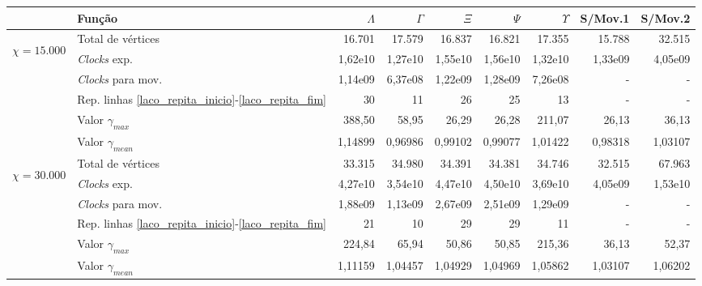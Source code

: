 \begin{table}
\begin{center}
\begin{tabular}{|c|l|r|r|r|r|r|r|r|} %
\hline
& Função & $\Lambda$ & $\Gamma$ & $\Xi$ & $\Psi$ & $\Upsilon$ & S/Mov.1 & S/Mov.2 \\
\hline %
\multirow{5}{*}{\begin{sideways}$\chi = 15.000$\end{sideways} } 
& Total de vértices                                                     & 16.701 & 17.579 & 16.837 & 16.821 & 17.355 & 15.788 & 32.515 \\
& {\it Clocks} exp.	                                             	& 1,62e10 & 1,27e10 & 1,55e10 & 1,56e10 & 1,32e10 & 1,33e09 & 4,05e09\\
& {\it Clocks} para mov.                                      		& 1,14e09 & 6,37e08 & 1,22e09 & 1,28e09 & 7,26e08 & - & - \\
& Rep. linhas \ref{laco_repita_inicio}-\ref{laco_repita_fim} 		& 30 & 11 & 26 & 25 & 13 & - & - \\
& Valor $\gamma_{max}$							& 388,50 & 58,95 & 26,29 & 26,28 & 211,07 & 26,13 & 36,13 \\
& Valor $\gamma_{mean}$							& 1,14899 & 0,96986 & 0,99102 & 0,99077 & 1,01422 & 0,98318 & 1,03107 \\
\hline %
\multirow{5}{*}{\begin{sideways}$\chi = 30.000$\end{sideways} } 
& Total de vértices                                                     & 33.315 & 34.980 &  34.391 & 34.381 & 34.746 & 32.515 & 67.963 \\
& {\it Clocks} exp.	                                             	& 4,27e10 & 3,54e10 & 4,47e10 & 4,50e10 & 3,69e10 & 4,05e09 & 1,53e10 \\
& {\it Clocks} para mov.                                      		& 1,88e09 & 1,13e09 & 2,67e09 & 2,51e09 & 1,29e09 & - & - \\
& Rep. linhas \ref{laco_repita_inicio}-\ref{laco_repita_fim} 		& 21 & 10 & 29 & 29 & 11 & - & - \\
& Valor $\gamma_{max}$							& 224,84 & 65,94 & 50,86 &  50,85 & 215,36 & 36,13 & 52,37 \\
& Valor $\gamma_{mean}$							& 1,11159 & 1,04457 & 1,04929 & 1,04969 & 1,05862 & 1,03107 & 1,06202 \\

\end{tabular}
\end{center}
\end{table}
